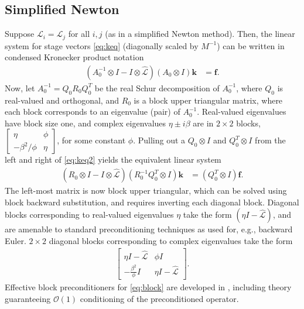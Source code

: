 \documentclass[review]{siamart}
\begin{document}
\subsection{Simplified Newton}\label{sec:nonlinear:simp}

Suppose $\mathcal{L}_i = \mathcal{L}_j$ for all $i,j$ (as in a simplified Newton method).
Then, the linear system for stage vectors \eqref{eq:keq} (diagonally scaled by $M^{-1}$)
can be written in condensed Kronecker product notation
%
\begin{align}\label{eq:keq2}
\left( A_0^{-1}\otimes I - I\otimes\widehat{\mathcal{L}}\right)
	(A_0\otimes I) \mathbf{k} & = \mathbf{f}.
\end{align}
%
Now, let $A_0^{-1} = Q_0R_0Q_0^T$ be the real Schur decomposition of $A_0^{-1}$, where
$Q_0$ is real-valued and orthogonal, and $R_0$ is a block
upper triangular matrix, where each block corresponds to an eigenvalue (pair) of
$A_0^{-1}$. Real-valued eigenvalues have block size one, and complex eigenvalues
$\eta\pm i\beta$ are in $2\times 2$ blocks,
$\begin{bmatrix} \eta & \phi \\-\beta^2/\phi & \eta\end{bmatrix}$, for some
constant $\phi$.
Pulling out a $Q_0\otimes I$ and $Q_0^T\otimes I$ from the left and right of
\eqref{eq:keq2} yields the equivalent linear system
%
\begin{align}\label{eq:keq3}
\left( R_0\otimes I - I \otimes \widehat{\mathcal{L}}\right)
	(R_0^{-1}Q_0^T\otimes I) \mathbf{k} & = (Q_0^T\otimes I)\mathbf{f}.
\end{align}
%
The left-most matrix is now block upper triangular, which can be solved
using block backward substitution, and requires inverting each diagonal block.
Diagonal blocks corresponding to real-valued eigenvalues $\eta$ take the form
$(\eta I - \widehat{\mathcal{L}})$, and are amenable to standard preconditioning
techniques as used for, e.g., backward Euler. $2\times 2$ diagonal blocks
corresponding to complex eigenvalues take the form
%
\begin{align}\label{eq:block}
\begin{bmatrix} \eta I - \widehat{\mathcal{L}} & \phi I\\
-\frac{\beta^2}{\phi} I & \eta I - \widehat{\mathcal{L}}\end{bmatrix}.
\end{align}
%
Effective block preconditioners for \eqref{eq:block} are developed in
, including theory guaranteeing $\mathcal{O}(1)$
conditioning of the preconditioned operator.
\end{document}
